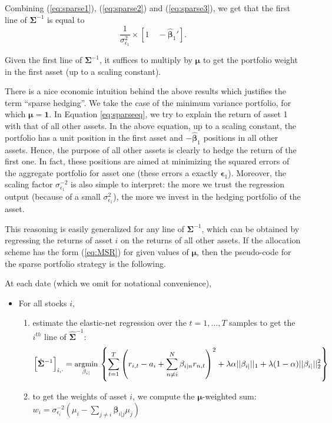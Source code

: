 \documentclass[]{krantz}
\theoremstyle{definition}
\theoremstyle{definition}
\theoremstyle{definition}
\theoremstyle{remark}
\begin{document}
Combining (\ref{eq:sparse1}), (\ref{eq:sparse2}) and (\ref{eq:sparse3}),
we get that the first line of \(\mathbf{\Sigma}^{-1}\) is equal to
\begin{equation}
\label{eq:sparsehedgeeq2}
\frac{1}{\sigma^2_{\epsilon_1}}\times \left[ 1 \quad  -\hat{\boldsymbol{\beta}}_1'\right].
\end{equation}

Given the first line of \(\mathbf{\Sigma}^{-1}\), it suffices to
multiply by \(\boldsymbol{\mu}\) to get the portfolio weight in the
first asset (up to a scaling constant).

There is a nice economic intuition behind the above results which
justifies the term ``sparse hedging''. We take the case of the minimum
variance portfolio, for which \(\boldsymbol{\mu}=\boldsymbol{1}\). In
Equation \eqref{eq:sparseeq}, we try to explain the return of asset 1 with
that of all other assets. In the above equation, up to a scaling
constant, the portfolio has a unit position in the first asset and
\(-\hat{\boldsymbol{\beta}}_1\) positions in all other assets. Hence,
the purpose of all other assets is clearly to hedge the return of the
first one. In fact, these positions are aimed at minimizing the squared
errors of the aggregate portfolio for asset one (these errors a exactly
\(\mathbf{\epsilon}_1\)). Moreover, the scaling factor
\(\sigma^{-2}_{\epsilon_1}\) is also simple to interpret: the more we
trust the regression output (because of a small
\(\sigma^{2}_{\epsilon_1}\)), the more we invest in the hedging
portfolio of the asset.

This reasoning is easily generalized for any line of
\(\mathbf{\Sigma}^{-1}\), which can be obtained by regressing the
returns of asset \(i\) on the returns of all other assets. If the
allocation scheme has the form (\ref{eq:MSR}) for given values of
\(\boldsymbol{\mu}\), then the pseudo-code for the sparse portfolio
strategy is the following.

At each date (which we omit for notational convenience),

\begin{itemize}
\item For all stocks $i$,
\begin{enumerate}
\item estimate the elastic-net regression over the $t=1,\dots,T$ samples to get the $i^{th}$ line of $\hat{\mathbf{\Sigma}}^{-1}$:
\begin{align*} \small \left[\hat{\mathbf{\Sigma}}^{-1}\right]_{i,\cdot}= \underset{\mathbf{\beta}_{i|}}{\text{argmin}}\, \left\{\sum_{t=1}^T\left( r_{i,t}-a_i+\sum_{n\neq i}^N\beta_{i|n}r_{n,t}\right)^2+\lambda \alpha ||  \mathbf{\beta}_{i|}||_1+\lambda (1-\alpha)||\mathbf{\beta}_{i|}||_2^2\right\}
\end{align*}
\item to get the weights of asset $i$, we compute the $\mathbf{\mu}$-weighted sum: $w_i= \sigma_{\epsilon_i}^{-2}\left(\mu_i- \sum_{j\neq i}\mathbf{\beta}_{i|j}\mu_j\right)$
\end{enumerate}
\end{itemize}
\end{document}
